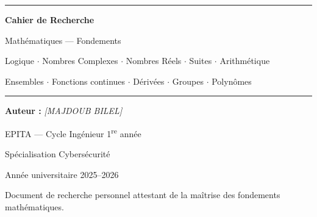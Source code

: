 \begin{titlepage}
\begin{center}

\vspace*{2cm}

{\color{deepblue}\rule{\textwidth}{2pt}}

\vspace{1cm}

{\Huge\bfseries\sffamily\color{deepblue} Cahier de Recherche}

\vspace{0.5cm}

{\LARGE\sffamily\color{accentblue} Mathématiques --- Fondements}

\vspace{0.3cm}

{\large\sffamily\color{darkgray} Logique \(\cdot\) Nombres Complexes \(\cdot\) Nombres Réels \(\cdot\) Suites \(\cdot\) Arithmétique}

\vspace{0.15cm}

{\large\sffamily\color{darkgray} Ensembles \(\cdot\) Fonctions continues \(\cdot\) Dérivées \(\cdot\) Groupes \(\cdot\) Polynômes}

\vspace{1cm}

{\color{deepblue}\rule{\textwidth}{2pt}}

\vspace{2cm}

{\Large\sffamily\color{darkgray} \textbf{Auteur :} \textit{[MAJDOUB BILEL]}}

\vspace{0.5cm}

{\large\sffamily\color{darkgray} EPITA --- Cycle Ingénieur 1\textsuperscript{re} année}

\vspace{0.3cm}

{\large\sffamily\color{darkgray} Spécialisation Cybersécurité}

\vspace{2cm}


\vfill

{\sffamily\color{darkgray} Année universitaire 2025--2026}

\vspace{0.5cm}

{\small\sffamily\color{darkgray!60} Document de recherche personnel attestant de la maîtrise des fondements mathématiques.}

\end{center}
\end{titlepage}
